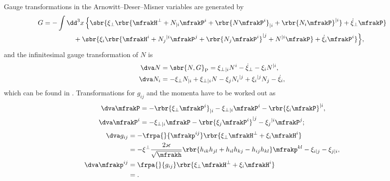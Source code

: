 \documentclass[a4paper,11pt]{article}
\begin{document}
Gauge transformations in the Arnowitt--Deser--Misner variables are generated by 
\cite{Castellani1982} 
\begin{align}
G &= -\int\dd^3 x\,\Big\{ \sbr{
	\xi_\perp \rbr{
		\mfrakH^\perp + N_{|i} \mfrakP^i + \rbr{N\mfrakP^i}_{|i} + 
			\rbr{N_i \mfrakP}^{|i}} +
	\dot{\xi}_\perp \mfrakP}
	\nonumber \\ &\qquad\qquad\ \,+ \sbr{
	\xi_i \rbr{
		\mfrakH^i + N_j{}^{|i} \mfrakP^j + \rbr{N_j \mfrakP^i}^{|j} + N^{|i} 
\mfrakP} +
	\dot{\xi}_i \mfrakP^i} \Big\},
\end{align}
and the infinitesimal gauge transformation of $N$ is
\begin{align}
\dva N &= \sbr{N, G}_\text{P} = 
\xi_\perp{}_{|i} N^i - \dot{\xi}_\perp - \xi_i N^{|i}, \\
\dva N_i &= %
- \xi_\perp N_{|i} + \xi_\perp{}_{|i} N
- \xi_j N_{i}{}^{|j} + \xi_i{}^{|j} N_j - \dot{\xi}_i,
\end{align}
which can be found in \cite{Kiriushcheva2008}. Transformations for 
$g_{ij}$ and the momenta have to be worked out as
\begin{align}
\dva \mfrakP &= -\rbr{\xi_\perp \mfrakP^i}_{|i} - \xi_\perp{}_{|i} \mfrakP^i
- \rbr{\xi_i \mfrakP}^{|i},\\
\dva \mfrakP^i &= -\xi_\perp{}_{|i} \mfrakP
- \rbr{\xi_j \mfrakP^i}^{|j} - \xi_j{}^{|i}\mfrakP^j;
\end{align}
\begin{align}
\dva g_{ij} &= -\frpa{}{\mfrakp^{ij}}
\rbr{\xi_\perp \mfrakH^\perp + \xi_i \mfrakH^i}
\nonumber \\
&= -\xi^\perp \frac{2\varkappa}{\sqrt{\mfrakh}}
\rbr{h_{ik}h_{jl}+h_{il}h_{kj}-h_{ij}h_{kl}} \mfrakp^{kl}
- \xi_{i|j} - \xi_{j|i}, \\
\dva \mfrakp^{ij} &= \frpa{}{g_{ij}}
\rbr{\xi_\perp \mfrakH^\perp + \xi_i \mfrakH^i}
\nonumber \\
&=.
\end{align}





\printbibliography
\end{document}
